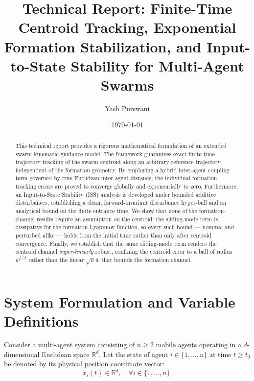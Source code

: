 \documentclass[11pt]{article}
\title{\textbf{Technical Report: Finite-Time Centroid Tracking, Exponential Formation Stabilization, and Input-to-State Stability for Multi-Agent Swarms}}
\author{Yash Purswani}
\date{\today}
\begin{document}
\maketitle

\begin{abstract}
This technical report provides a rigorous mathematical formulation of an extended swarm kinematic guidance model. The framework guarantees exact finite-time trajectory tracking of the swarm centroid along an arbitrary reference trajectory, independent of the formation geometry. By employing a hybrid inter-agent coupling term governed by true Euclidean inter-agent distance, the individual formation tracking errors are proved to converge globally and exponentially to zero. Furthermore, an Input-to-State Stability (ISS) analysis is developed under bounded additive disturbances, establishing a clean, forward-invariant disturbance hyper-ball and an analytical bound on the finite entrance time. We show that none of the formation-channel results require an assumption on the centroid: the sliding-mode term is dissipative for the formation Lyapunov function, so every such bound --- nominal and perturbed alike --- holds from the initial time rather than only after centroid convergence. Finally, we establish that the same sliding-mode term renders the centroid channel \emph{super-linearly} robust, confining the centroid error to a ball of radius $\bar{w}^{1/\beta}$ rather than the linear $\sqrt{n}\bar{w}$ that bounds the formation channel.
\end{abstract}

\section{System Formulation and Variable Definitions}

Consider a multi-agent system consisting of $n \ge 2$ mobile agents operating in a $d$-dimensional Euclidean space $\mathbb{R}^d$. Let the state of agent $i \in \{1, \dots, n\}$ at time $t \ge t_0$ be denoted by its physical position coordinate vector:
\begin{equation}
x_i(t) \in \mathbb{R}^d, \quad \forall i \in \{1, \dots, n\}.
\end{equation}
\end{document}
